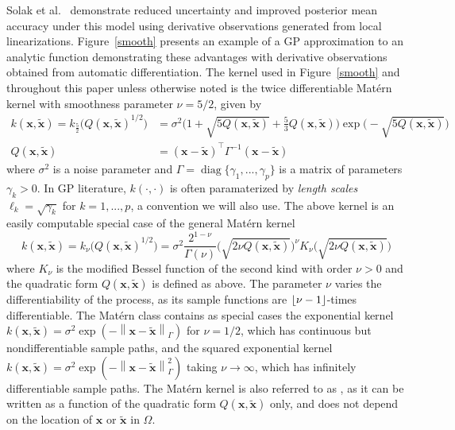 \documentclass{article}
\newcommand{\norm}[1]{\left\lVert#1\right\rVert}
\renewcommand{\vec}[1]{\mathbf{#1}}
\DeclareMathOperator{\diag}{diag}
\DeclarePairedDelimiter\floor{\lfloor}{\rfloor}
\begin{document}
Solak et al.~\cite{solak2003derivative} demonstrate reduced uncertainty and improved posterior mean accuracy under this model using derivative observations generated from local linearizations. Figure~\ref{smooth} presents an example of a GP approximation to an analytic function demonstrating these advantages with derivative observations obtained from automatic differentiation. The kernel used in Figure~\ref{smooth} and throughout this paper unless otherwise noted is the twice differentiable Mat\'ern kernel with smoothness parameter $\nu = 5/2$, given by
\begin{align*}
  k(\vec{x}, \tilde{\vec{x}}) = k_{\frac{5}{2}}\Big(Q(\vec{x}, \tilde{\vec{x}})^{1/2}\Big) & = \sigma^2 \Big(1 + \sqrt{5Q(\vec{x}, \tilde{\vec{x}})} + \frac{5}{3}Q(\vec{x}, \tilde{\vec{x}}) \Big) \exp\Big( - \sqrt{5Q(\vec{x}, \tilde{\vec{x}})} \Big) \\
  Q(\vec{x}, \tilde{\vec{x}}) & = (\vec{x} - \tilde{\vec{x}})^\top \Gamma^{-1} (\vec{x} - \tilde{\vec{x}})
\end{align*}
where $\sigma^2$ is a noise parameter and $\Gamma = \diag\{\gamma_1,...,\gamma_p\}$ is a matrix of parameters $\gamma_k > 0$. In GP literature, $k(\cdot, \cdot)$ is often paramaterized by \textit{length scales} $\ell_k = \sqrt{\gamma_k}$ for $k=1,...,p$, a convention we will also use.
The above kernel is an easily computable special case of the general Mat\'ern kernel
$$ k(\vec{x}, \tilde{\vec{x}}) = k_\nu \Big(Q(\vec{x}, \tilde{\vec{x}})^{1/2}\Big) = \sigma^2 \frac{2^{1-\nu}}{\Gamma(\nu)} \Big(\sqrt{2\nu Q(\vec{x}, \tilde{\vec{x}})}\Big)^\nu K_\nu\Big(\sqrt{2\nu Q(\vec{x}, \tilde{\vec{x}})}\Big) $$
where $K_\nu$ is the modified Bessel function of the second kind with order $\nu > 0$ and the quadratic form $Q(\vec{x}, \tilde{\vec{x}})$ is defined as above. The parameter $\nu$ varies the differentiability of the process, as its sample functions are $\floor{\nu-1}$-times differentiable. The Mat\'ern class contains as special cases the exponential kernel
$k(\vec{x}, \tilde{\vec{x}}) = \sigma^2 \exp(-\norm{\vec{x} - \tilde{\vec{x}}}_\Gamma)$ for $\nu = 1/2$, which has continuous but nondifferentiable sample paths, and the squared exponential kernel $k(\vec{x}, \tilde{\vec{x}}) = \sigma^2 \exp(-\norm{\vec{x} - \tilde{\vec{x}}}_\Gamma^2)$
taking $\nu \to \infty$, which has infinitely differentiable sample paths. The Mat\'ern kernel is also referred to as , as it can be written as a function of the quadratic form $Q(\vec{x}, \tilde{\vec{x}})$ only, and does not depend on the location of $\vec{x}$ or $\tilde{\vec{x}}$ in $\Omega$.
\end{document}
